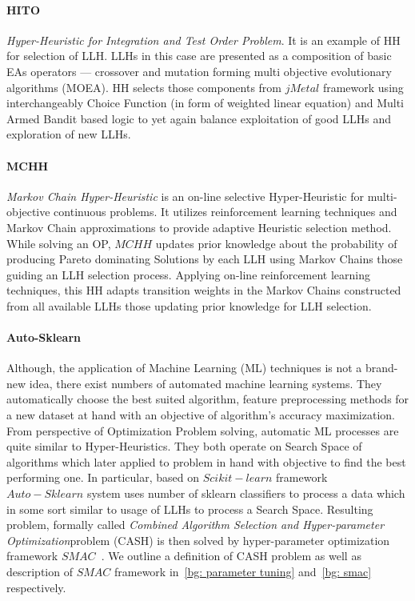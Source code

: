 \paragraph{HITO~\cite{guizzo2015hyper}}\textit{Hyper-Heuristic for Integration and Test Order Problem}. It is an example of HH for selection of LLH. LLHs in this case are presented as a composition of basic EAs operators — crossover and mutation forming multi objective evolutionary algorithms (MOEA). HH  selects those components from $jMetal$ framework\cite{durillo2011jmetal} using interchangeably Choice Function (in form of weighted linear equation) and Multi Armed Bandit based logic to yet again balance exploitation of good LLHs and exploration of new LLHs.


\paragraph{MCHH~\cite{mcclymont2011markov}}\textit{Markov Chain Hyper-Heuristic} is an on-line selective Hyper-Heuristic for multi-objective continuous problems. It utilizes reinforcement learning techniques and Markov Chain approximations to provide adaptive Heuristic selection method. While solving an OP, $MCHH$ updates prior knowledge about the probability of producing Pareto dominating Solutions by each LLH using Markov Chains those guiding an LLH selection process. Applying on-line reinforcement learning techniques, this HH adapts transition weights in the Markov Chains constructed from all available LLHs those updating prior knowledge for LLH selection.

\paragraph{Auto-Sklearn~\cite{kerschke2019automated}} Although, the application of Machine Learning (ML) techniques is not a brand-new idea, there exist numbers of automated machine learning systems. They automatically choose the best suited algorithm, feature preprocessing methods for a new dataset at hand with an objective of algorithm's accuracy maximization. From perspective of Optimization Problem solving, automatic ML processes are quite similar to Hyper-Heuristics. They both operate on Search Space of algorithms which later applied to problem in hand with objective to find the best performing one. In particular, based on $Scikit-learn$ framework~\cite{scikit-learn} $Auto-Sklearn$ system uses number of sklearn classifiers to process a data which in some sort similar to usage of LLHs to process a Search Space. Resulting problem, formally called \textit{Combined Algorithm Selection and Hyper-parameter Optimization}problem (CASH) is then solved by hyper-parameter optimization framework $SMAC$~\cite{hutter2011sequential}. We outline a definition of CASH problem as well as description of $SMAC$ framework in~\ref{bg: parameter tuning} and~\ref{bg: smac} respectively.


